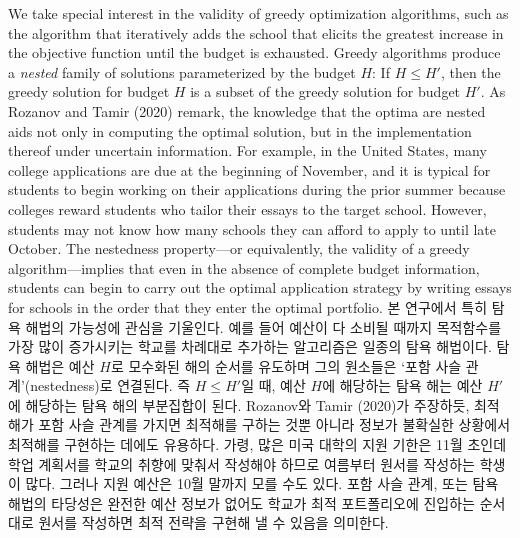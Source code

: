 \documentclass[11pt]{article} %
\theoremstyle{definition}
\theoremstyle{definition}
\begin{document}
\ifen
We take special interest in the validity of greedy optimization algorithms, such as the algorithm that iteratively adds the school that elicits the greatest increase in the objective function until the budget is exhausted. Greedy algorithms produce a \emph{nested} family of solutions parameterized by the budget $H$: If $H \leq H'$, then the greedy solution for budget $H$ is a subset of the greedy solution for budget $H'$. As Rozanov and Tamir (2020) remark, the knowledge that the optima are nested aids not only in computing the optimal solution, but in the implementation thereof under uncertain information. For example, in the United States, many college applications are due at the beginning of November, and it is typical for students to begin working on their applications during the prior summer because colleges reward students who tailor their essays to the target school. However, students may not know how many schools they can afford to apply to until late October. The nestedness property---or equivalently, the validity of a greedy algorithm---implies that even in the absence of complete budget information, students can begin to carry out the optimal application strategy by writing essays for schools in the order that they enter the optimal portfolio.
\else
본 연구에서 특히 탐욕 해법의 가능성에 관심을 기울인다. 예를 들어 예산이 다 소비될 때까지 목적함수를 가장 많이 증가시키는 학교를 차례대로 추가하는 알고리즘은 일종의 탐욕 해법이다. 탐욕 해법은 예산 $H$로 모수화된 해의 순서를 유도하며 그의 원소들은 `포함 사슬 관계'(nestedness)로 연결된다. 즉 $H \leq H'$일 때, 예산 $H$에 해당하는 탐욕 해는 예산 $H'$에 해당하는 탐욕 해의 부분집합이 된다. Rozanov와 Tamir (2020)가 주장하듯, 최적해가 포함 사슬 관계를 가지면 최적해를 구하는 것뿐 아니라 정보가 불확실한 상황에서 최적해를 구현하는 데에도 유용하다. 가령, 많은 미국 대학의 지원 기한은 11월 초인데 학업 계획서를 학교의 취향에 맞춰서 작성해야 하므로 여름부터 원서를 작성하는 학생이 많다. 그러나 지원 예산은 10월 말까지 모를 수도 있다. 포함 사슬 관계, 또는 탐욕 해법의 타당성은 완전한 예산 정보가 없어도 학교가 최적 포트폴리오에 진입하는 순서대로 원서를 작성하면 최적 전략을 구현해 낼 수 있음을 의미한다.
\fi
\end{document}
